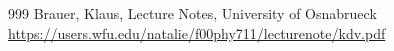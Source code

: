 \begin{thebibliography}{999}
 Brauer, Klaus, Lecture Notes, University of Osnabrueck {\scriptsize \url{https://users.wfu.edu/natalie/f00phy711/lecturenote/kdv.pdf}}
\end{thebibliography}


